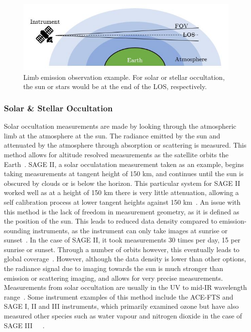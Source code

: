  \begin{figure}
\centering
  \includegraphics{chap2_images/Limb_emission_geometry_example.JPG}
  \caption{Limb emission observation example. For solar or stellar occultation, the sun or stars would be at the end of the LOS, respectively.}
  \label{fig:limb_emission_geometry}
\end{figure}

\subsubsection{Solar \& Stellar Occultation}
Solar occultation measurements are made by looking through the atmospheric limb at the atmosphere at the sun. The radiance emitted by the sun and attenuated by the atmosphere through absorption or scattering is measured. This method allows for altitude resolved measurements as the satellite orbits the Earth~\citep{SPARC}. SAGE II, a solar occulatation measurement taken as an example, begins taking measurements at tangent height of 150 km, and continues until the sun is obscured by clouds or is below the horizon. This particular system for SAGE II worked well as at a height of 150 km there is very little attenuation, allowing a self calibration process at lower tangent heights against 150 km~\citep{SAGEII_solar_occultation}. An issue with this method is the lack of freedom in measurement geometry, as it is defined as the position of the sun. This leads to reduced data density compared to emission-sounding instruments, as the instrument can only take images at sunrise or sunset~\citep{SPARC}. In the case of SAGE II, it took measurements 30 times per day, 15 per sunrise or sunset. Through a number of orbits however, this eventually leads to global coverage~\citep{SAGEII_solar_occultation}. However, although the data density is lower than other options, the radiance signal due to imaging towards the sun is much stronger than emission or scattering imaging, and allows for very precise measurements. Measurements from solar occultation are usually in the UV to mid-IR wavelength range~\citep{SPARC}. Some instrument examples of this method include the ACE-FTS and SAGE I, II and III instruments, which primarily examined ozone but have also measured other species such as water vapour and nitrogen dioxide in the case of SAGE III~\citep{ACE_FTS}~\citep{SAGEI_and_II}~\citep{SAGE_III}.

